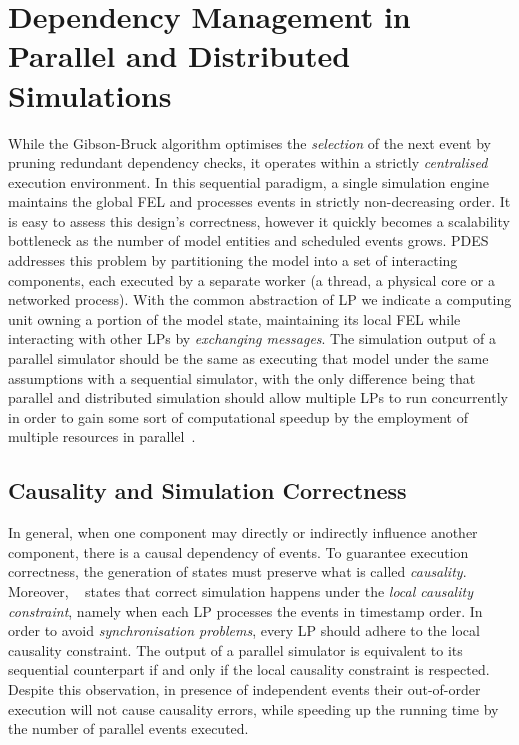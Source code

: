 \section{Dependency Management in Parallel and Distributed Simulations}
\label{sec:pdes}

While the Gibson-Bruck algorithm optimises the \emph{selection} of the next
event by pruning redundant dependency checks, it operates within a strictly
\emph{centralised} execution environment. In this sequential paradigm, a single
simulation engine maintains the global \ac{FEL} and processes events in
strictly non-decreasing order. It is easy to assess this design's correctness,
however it quickly becomes a scalability bottleneck as the number of model
entities and scheduled events grows. \ac{PDES} addresses this problem by
partitioning the model into a set of interacting components, each executed by a
separate worker (a thread, a physical core or a networked process). With the
common abstraction of \ac{LP} we indicate a computing unit owning a portion of
the model state, maintaining its local \ac{FEL} while interacting with other
\ac{LP}s by \emph{exchanging messages}. The simulation output of a parallel
simulator should be the same as executing that model under the same assumptions
with a sequential simulator, with the only difference being that parallel and
distributed simulation should allow multiple LPs to run concurrently in order
to gain some sort of computational speedup by the employment of multiple
resources in parallel~\cite{fujimoto1993FAPDESWFS}.

\subsection{Causality and Simulation Correctness}
In general, when one component may directly or indirectly influence another
component, there is a causal dependency of events. To guarantee execution
correctness, the generation of states must preserve what is called
\emph{causality}. Moreover, ~\cite{Fujimoto1990PDES} states that correct
simulation happens under the \emph{local causality constraint}, namely when
each \ac{LP} processes the events in timestamp order. In order to avoid
\emph{synchronisation problems}, every \ac{LP} should adhere to the local
causality constraint. The output of a parallel simulator is equivalent to its
sequential counterpart if and only if the local causality constraint is
respected. Despite this observation, in presence of independent events their
out-of-order execution will not cause causality errors, while speeding up the
running time by the number of parallel events executed.

